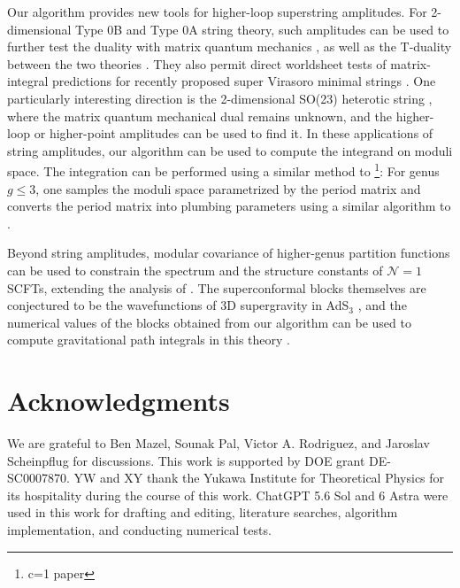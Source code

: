 \documentclass[aps,10pt,twocolumn,superscriptaddress]{revtex4-2}
\begin{document}
Our algorithm provides new tools for higher-loop superstring amplitudes. For 2-dimensional Type 0B and Type 0A string theory, such amplitudes can be used to further test the duality with matrix quantum mechanics \cite{Takayanagi:2003sm,Douglas:2003up,Balthazar:2022atu,Balthazar:2022apu}, as well as the T-duality between the two theories \cite{Yin:2003iv}. They also permit direct worldsheet tests of matrix-integral predictions for recently proposed super Virasoro minimal strings \cite{Johnson:2024fkm,Johnson:2025vyz,Johnson:2026ugu,Rangamani:2025wfa,Eberhardt:2026hfh}. One particularly interesting direction is the 2-dimensional SO(23) heterotic string \cite{Davis:2005qe}, where the matrix quantum mechanical dual remains unknown, and the higher-loop or higher-point amplitudes can be used to find it. In these applications of string amplitudes, our algorithm can be used to compute the integrand on moduli space. The integration can be performed using a similar method to \footnote{c=1 paper}: For genus $g\leq 3$, one samples the moduli space parametrized by the period matrix and converts the period matrix into plumbing parameters using a similar algorithm to \cite{Christian:2026qqy}. 

Beyond string amplitudes, modular covariance of higher-genus partition functions can be used to constrain the spectrum and the structure constants of $\mathcal{N}=1$ SCFTs, extending the analysis of \cite{Cho:2017fzo}. The superconformal blocks themselves are conjectured to be the wavefunctions of 3D  supergravity in AdS${}_3$ \cite{Eberhardt:2026hfh}, and the numerical values of the blocks obtained from our algorithm can be used to compute gravitational path integrals in this theory \cite{Bhattacharyya:2024vnw}.

\section*{Acknowledgments}

We are grateful to Ben Mazel, Sounak Pal, Victor A. Rodriguez, and Jaroslav Scheinpflug for discussions. This work is supported by DOE grant DE-SC0007870. YW and XY thank the Yukawa Institute for Theoretical Physics for its hospitality during the course of this work. ChatGPT 5.6 Sol and 6 Astra were used in this work for drafting and editing, literature searches, algorithm implementation, and conducting numerical tests. 
\end{document}
